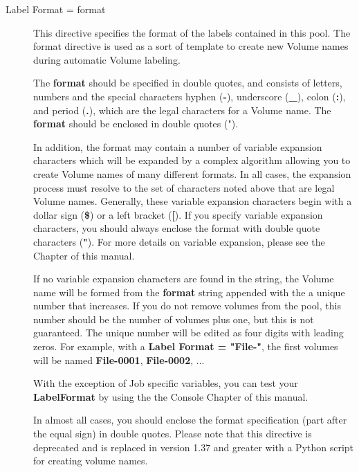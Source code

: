 \begin{description}
\label{Label}
\item [Label Format = \lt{}format\gt{}]
   This directive specifies the format of the labels contained in this
   pool.  The format directive is used as a sort of template to create new
   Volume names during automatic Volume labeling.

   The {\bf format} should be specified in double quotes, and consists of
   letters, numbers and the special characters hyphen ({\bf -}), underscore
   ({\bf \_}), colon ({\bf :}), and period ({\bf .}), which are the legal
   characters for a Volume name.  The {\bf format} should be enclosed in
   double quotes (").

   In addition, the format may contain a number of variable expansion
   characters which will be expanded by a complex algorithm allowing you to
   create Volume names of many different formats.  In all cases, the
   expansion process must resolve to the set of characters noted above that
   are legal Volume names.  Generally, these variable expansion characters
   begin with a dollar sign ({\bf \$}) or a left bracket ({\bf [}).  If you
   specify variable expansion characters, you should always enclose the
   format with double quote characters ({\bf "}).  For more details on
   variable expansion, please see the  Chapter of this manual.

   If no variable expansion characters are found in the string, the Volume
   name will be formed from the {\bf format} string appended with the
   a unique number that increases.  If you do not remove volumes from the
   pool, this number should be the number of volumes plus one, but this
   is not guaranteed. The unique number will be edited as four
   digits with leading zeros.  For example, with a {\bf Label Format =
   "File-"}, the first volumes will be named {\bf File-0001}, {\bf
   File-0002}, ...

   With the exception of Job specific variables, you can test your {\bf
   LabelFormat} by using the  the Console Chapter
   of this manual.

   In almost all cases, you should enclose the format specification (part
   after the equal sign) in double quotes.  Please note that this directive
   is deprecated and is replaced in version 1.37 and greater with a Python
   script for creating volume names.

\end{description}

